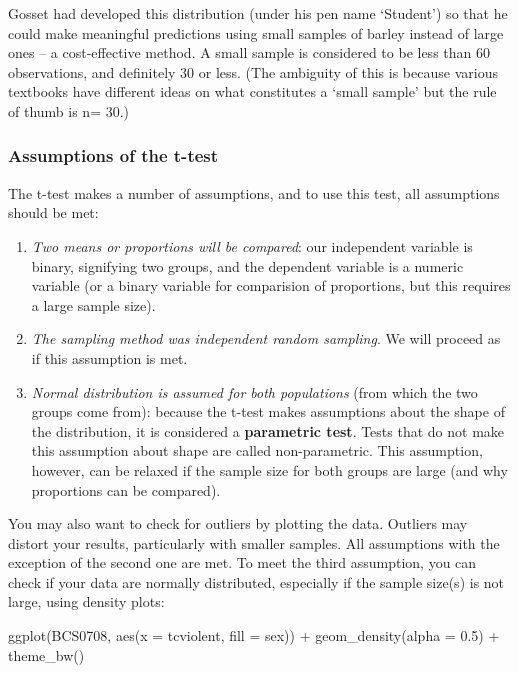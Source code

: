 \documentclass[
]{book}
\newenvironment{Shaded}{\begin{snugshade}}{\end{snugshade}}
\newcommand{\AttributeTok}[1]{\textcolor[rgb]{0.77,0.63,0.00}{#1}}
\newcommand{\FloatTok}[1]{\textcolor[rgb]{0.00,0.00,0.81}{#1}}
\newcommand{\FunctionTok}[1]{\textcolor[rgb]{0.00,0.00,0.00}{#1}}
\newcommand{\NormalTok}[1]{#1}
\newcommand{\SpecialCharTok}[1]{\textcolor[rgb]{0.00,0.00,0.00}{#1}}
\begin{document}
Gosset had developed this distribution (under his pen name `Student') so that he could make meaningful predictions using small samples of barley instead of large ones -- a cost-effective method. A small sample is considered to be less than 60 observations, and definitely 30 or less. (The ambiguity of this is because various textbooks have different ideas on what constitutes a `small sample' but the rule of thumb is n= 30.)

\hypertarget{assumptions-of-the-t-test}{%
\subsubsection{Assumptions of the t-test}\label{assumptions-of-the-t-test}}

The t-test makes a number of assumptions, and to use this test, all assumptions should be met:

\begin{enumerate}
\def\labelenumi{\arabic{enumi}.}
\item
  \emph{Two means or proportions will be compared}: our independent variable is binary, signifying two groups, and the dependent variable is a numeric variable (or a binary variable for comparision of proportions, but this requires a large sample size).
\item
  \emph{The sampling method was independent random sampling}. We will proceed as if this assumption is met.
\item
  \emph{Normal distribution is assumed for both populations} (from which the two groups come from): because the t-test makes assumptions about the shape of the distribution, it is considered a \textbf{parametric test}. Tests that do not make this assumption about shape are called non-parametric. This assumption, however, can be relaxed if the sample size for both groups are large (and why proportions can be compared).
\end{enumerate}

You may also want to check for outliers by plotting the data. Outliers may distort your results, particularly with smaller samples. All assumptions with the exception of the second one are met. To meet the third assumption, you can check if your data are normally distributed, especially if the sample size(s) is not large, using density plots:

\begin{Shaded}
\begin{Highlighting}[]
\FunctionTok{ggplot}\NormalTok{(BCS0708, }\FunctionTok{aes}\NormalTok{(}\AttributeTok{x =}\NormalTok{ tcviolent, }\AttributeTok{fill =}\NormalTok{ sex)) }\SpecialCharTok{+}
  \FunctionTok{geom\_density}\NormalTok{(}\AttributeTok{alpha =} \FloatTok{0.5}\NormalTok{) }\SpecialCharTok{+}
  \FunctionTok{theme\_bw}\NormalTok{()}
\end{Highlighting}
\end{Shaded}
\end{document}
